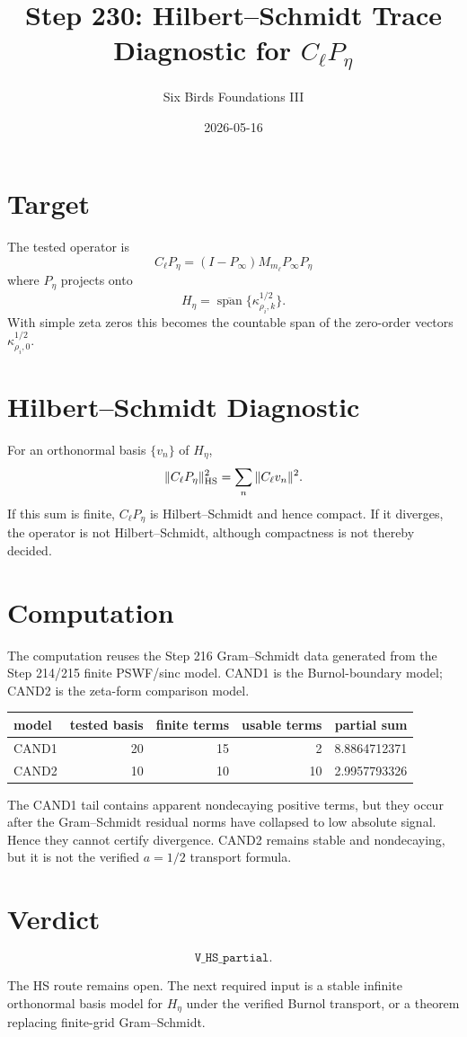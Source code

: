 \documentclass{article}
\title{Step 230: Hilbert--Schmidt Trace Diagnostic for \(C_\ell P_\eta\)}
\author{Six Birds Foundations III}
\date{2026-05-16}
\begin{document}
\maketitle

\section{Target}

The tested operator is
\[
  C_\ell P_\eta = (I-P_\infty)M_{m_\ell}P_\infty P_\eta
\]
where \(P_\eta\) projects onto
\[
  H_\eta=\overline{\operatorname{span}}\{\kappa_{\rho_i,k}^{1/2}\}.
\]
With simple zeta zeros this becomes the countable span of the zero-order vectors \(\kappa_{\rho_i,0}^{1/2}\).

\section{Hilbert--Schmidt Diagnostic}

For an orthonormal basis \(\{v_n\}\) of \(H_\eta\),
\[
  \|C_\ell P_\eta\|_{\rm HS}^2
  =
  \sum_n \|C_\ell v_n\|^2.
\]
If this sum is finite, \(C_\ell P_\eta\) is Hilbert--Schmidt and hence compact. If it diverges, the operator is not Hilbert--Schmidt, although compactness is not thereby decided.

\section{Computation}

The computation reuses the Step 216 Gram--Schmidt data generated from the Step 214/215 finite PSWF/sinc model. CAND1 is the Burnol-boundary model; CAND2 is the zeta-form comparison model.

\begin{center}
\begin{tabular}{lrrrr}
\toprule
model & tested basis & finite terms & usable terms & partial sum\\
\midrule
CAND1 & 20 & 15 & 2 & 8.8864712371\\
CAND2 & 10 & 10 & 10 & 2.9957793326\\
\bottomrule
\end{tabular}
\end{center}

The CAND1 tail contains apparent nondecaying positive terms, but they occur after the Gram--Schmidt residual norms have collapsed to low absolute signal. Hence they cannot certify divergence. CAND2 remains stable and nondecaying, but it is not the verified \(a=1/2\) transport formula.

\section{Verdict}

\[
  \boxed{\texttt{V\_HS\_partial}.}
\]

The HS route remains open. The next required input is a stable infinite orthonormal basis model for \(H_\eta\) under the verified Burnol transport, or a theorem replacing finite-grid Gram--Schmidt.
\end{document}
